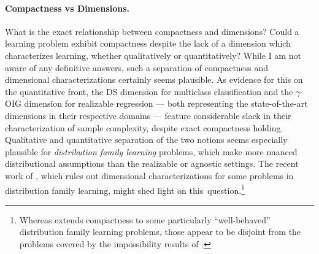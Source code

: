 \paragraph{Compactness vs Dimensions.} What is the exact relationship between compactness and dimensions? 
Could a learning problem exhibit compactness despite the lack of a dimension which characterizes learning, whether qualitatively or quantitatively? While I am not aware of any definitive answers, such a separation of compactness and dimensional characterizations  certainly seems plausible. As evidence for this on the quantitative front, the DS dimension for multiclass classification and the $\gamma$-OIG dimension for realizable regression --- both representing the state-of-the-art dimensions in their respective domains --- feature considerable slack in their characterization of sample complexity, despite exact compactness holding. Qualitative and quantitative separation of the two notions seems especially plausible for \emph{distribution family learning} problems, which make more nuanced distributional assumptions than the realizable or agnostic settings. The recent work of \citet{lechner_inherent_2024}, which  rules out dimensional characterizations for  some problems in distribution family learning,   might shed light on this~question.\footnote{Whereas \cite{asilis_transductive_2024} extends compactness to some particularly ``well-behaved''   distribution family learning problems, those appear to be disjoint from the problems covered by the impossibility results of \cite{lechner_inherent_2024}.}







